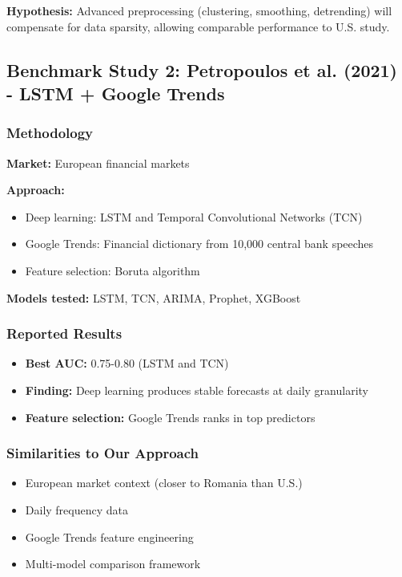 \documentclass[12pt,a4paper]{article}
\begin{document}
\textbf{Hypothesis:} Advanced preprocessing (clustering, smoothing, detrending) will compensate for data sparsity, allowing comparable performance to U.S. study.

\subsection{Benchmark Study 2: Petropoulos et al. (2021) - LSTM + Google Trends}

\subsubsection{Methodology}

\textbf{Market:} European financial markets

\textbf{Approach:}
\begin{itemize}
    \item Deep learning: LSTM and Temporal Convolutional Networks (TCN)
    \item Google Trends: Financial dictionary from 10,000 central bank speeches
    \item Feature selection: Boruta algorithm
\end{itemize}

\textbf{Models tested:} LSTM, TCN, ARIMA, Prophet, XGBoost

\subsubsection{Reported Results}

\begin{itemize}
    \item \textbf{Best AUC:} 0.75-0.80 (LSTM and TCN)
    \item \textbf{Finding:} Deep learning produces stable forecasts at daily granularity
    \item \textbf{Feature selection:} Google Trends ranks in top predictors
\end{itemize}

\subsubsection{Similarities to Our Approach}

\begin{itemize}
    \item European market context (closer to Romania than U.S.)
    \item Daily frequency data
    \item Google Trends feature engineering
    \item Multi-model comparison framework
\end{itemize}
\end{document}
